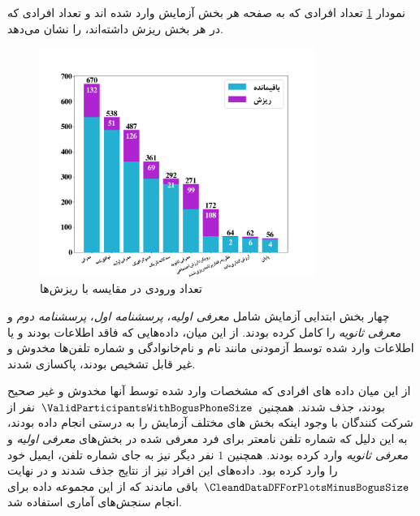 نمودار
\ref{fig:PageNotSubmitedDataFrame}
تعداد افرادی که به صفحه هر بخش آزمایش وارد شده اند و تعداد افرادی  که در هر بخش ریزش داشته‌اند، را نشان می‌دهد.
\begin{figure}[ht]
    \centerline{\includegraphics[width=0.8\textwidth]{./img/PageNotSubmitedDataFrame.png}}
    \caption{تعداد ورودی در مقایسه با ریزش‌ها}
    \label{fig:PageNotSubmitedDataFrame}
\end{figure}




% 

چهار بخش ابتدایی آزمایش شامل
\textit{معرفی اولیه}،
\textit{پرسشنامه اول}،
\textit{پرسشنامه دوم} و
\textit{معرفی ثانویه}
را کامل کرده بودند.
از این میان، داده‌هایی که فاقد اطلاعات بودند و یا اطلاعات وارد شده توسط آزمودنی
مانند نام و نام‌خانوادگی و شماره تلفن‌ها مخدوش و غیر قابل تشخیص بودند، پاکسازی شدند.

از این میان داده های افرادی که مشخصات وارد شده توسط آنها مخدوش و غیر صحیح
بودند، جذف شدند. همچنین
$\ValidParticipantsWithBogusPhoneSize$
نفر  از شرکت کنندگان با وجود اینکه
بخش های مختلف آزمایش را به درستی انجام داده بودند، به این دلیل که شماره تلفن نامعتر
برای فرد معرفی شده در بخش‌های
\textit{معرفی اولیه}
و
\textit{معرفی ثانویه}
وارد کرده بودند. همچنین
$1$
نفر دیگر نیز به جای شماره تلفن، ایمیل خود را وارد کرده بود. داده‌های این افراد نیز از نتایج جذف شدند
و در نهایت
$\CleandDataDFForPlotsMinusBogusSize$
باقی ماندند که از این مجموعه داده برای انجام سنجش‌های آماری استفاده شد.

